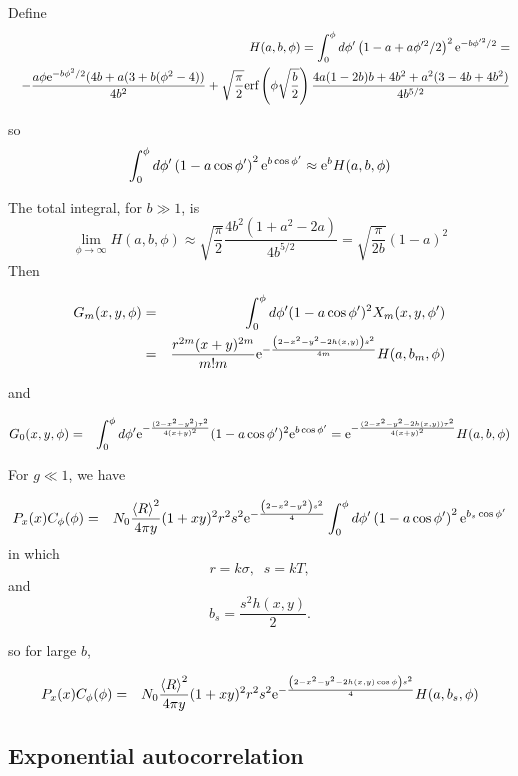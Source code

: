 \documentclass[11pt]{article}
\newcommand{\e}{{\rm e}}
\begin{document}
{{{{Define
\begin{eqnarray}
&&H(a,b,\phi)=\int_{0}^{\phi}d\phi'\left(1-a+a\phi'^{2}/2\right)^{2}\e^{-b\phi'^{2}/2}=\\
&&-\frac{a\phi\e^{-b\phi^{2}/2}(4b+a(3+b(\phi^{2}-4))}{4b^{2}}+\sqrt{\frac{\pi}{2}}\textrm{erf}\left(\phi\sqrt{\frac{b}{2}}\right)\frac{4a(1-2b)b+4b^{2}+a^{2}(3-4b+4b^{2})}{4b^{5/2}}\end{eqnarray}

so
$$\int_{0}^{\phi}d\phi'\left(1-a\cos\phi' \right)^{2}\e^{b\cos\phi'}\approx\e^{b}H(a,b,\phi)$$


The total integral, for $b\gg1$, is
$$\lim_{\phi\rightarrow\infty}H(a,b,\phi)\approx\sqrt{\frac{\pi}{2}}\frac{4b^{2}(1+a^{2}-2a)}{4b^{5/2}}=\sqrt{\frac{\pi}{2b}}(1-a)^{2}$$
Then

\begin{eqnarray}
G_{m}(x,y,\phi)&=&\int_{0}^{\phi}d\phi'(1-a\cos\phi')^{2}X_{m}(x,y,\phi')\\&=&\frac{r^{2m}(x+y)^{2m}}{m!m}\e^{-\frac{\left(2-x^{2}-y^{2}-2h(x,y)\right)s^{2}}{4m}}H(a,b_{m},\phi)\end{eqnarray}

and

\begin{eqnarray}
G_{0}(x,y,\phi)&=&\int_{0}^{\phi}d\phi'\e^{-\frac{(2-x^{2}-y^{2})\tau^{2}}{4(x+y)^{2}}}(1-a\cos\phi')^{2}\e^{b\cos\phi'}=\e^{-\frac{(2-x^{2}-y^{2}-2h(x,y))\tau^{2}}{4(x+y)^{2}}}H(a,b,\phi)
\end{eqnarray}

For $g\ll 1$, we have


\begin{eqnarray}
P_x(x)C_{\phi}(\phi)
&=& N_{0}\frac{\left<R\right>^{2}}{4\pi y}(1+xy)^{2}r^{2}s^{2}\e^{-\frac{\left(2-x^{2}-y^{2}\right)s^{2}}{4}}
\int_{0}^{\phi}d\phi'\left(1-a\cos\phi'\right)^{2}\e^{b_{s}\cos\phi'}
\end{eqnarray}
in which
$$r=k\sigma,\;\;s=kT,$$
and
$$b_{s}=\frac{s^{2}h(x,y)}{2}.$$

so for large $b$,

\begin{eqnarray}
P_x(x)C_{\phi}(\phi)&=& N_{0}\frac{\left<R\right>^{2}}{4\pi y}(1+xy)^{2}r^{2}s^{2}\e^{-\frac{\left(2-x^{2}-y^{2}-2h(x,y)\cos\phi\right)s^{2}}{4}}H(a,b_{s},\phi)
\end{eqnarray}

\subsection{Exponential autocorrelation}

}}}}
\end{document}
